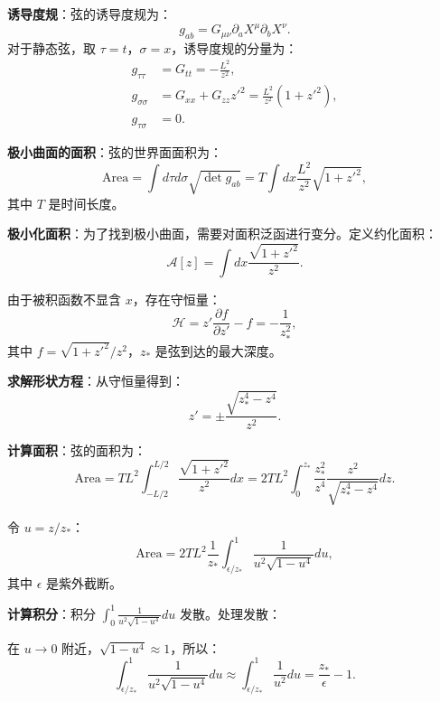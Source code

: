 \textbf{诱导度规}：弦的诱导度规为：
\begin{equation}
    g_{ab} = G_{\mu\nu} \partial_a X^\mu \partial_b X^\nu.
\end{equation}
对于静态弦，取 $\tau = t$，$\sigma = x$，诱导度规的分量为：
\begin{align}
    g_{\tau\tau} &= G_{tt} = -\frac{L^2}{z^2}, \\
    g_{\sigma\sigma} &= G_{xx} + G_{zz} z'^2 = \frac{L^2}{z^2}(1 + z'^2), \\
    g_{\tau\sigma} &= 0.
\end{align}

\textbf{极小曲面的面积}：弦的世界面面积为：
\begin{equation}
    \text{Area} = \int d\tau d\sigma \sqrt{\det g_{ab}} = T \int dx \frac{L^2}{z^2} \sqrt{1 + z'^2},
\end{equation}
其中 $T$ 是时间长度。

\textbf{极小化面积}：为了找到极小曲面，需要对面积泛函进行变分。定义约化面积：
\begin{equation}
    \mathcal{A}[z] = \int dx \frac{\sqrt{1 + z'^2}}{z^2}.
\end{equation}

由于被积函数不显含 $x$，存在守恒量：
\begin{equation}
    \mathcal{H} = z' \frac{\partial f}{\partial z'} - f = -\frac{1}{z_*^2},
\end{equation}
其中 $f = \sqrt{1 + z'^2}/z^2$，$z_*$ 是弦到达的最大深度。

\textbf{求解形状方程}：从守恒量得到：
\begin{equation}
    z' = \pm \frac{\sqrt{z_*^4 - z^4}}{z^2}.
\end{equation}

\textbf{计算面积}：弦的面积为：
\begin{equation}
    \text{Area} = T L^2 \int_{-L/2}^{L/2} \frac{\sqrt{1 + z'^2}}{z^2} dx = 2 T L^2 \int_0^{z_*} \frac{z_*^2}{z^4} \frac{z^2}{\sqrt{z_*^4 - z^4}} dz.
\end{equation}

令 $u = z/z_*$：
\begin{equation}
    \text{Area} = 2 T L^2 \frac{1}{z_*} \int_{\epsilon/z_*}^1 \frac{1}{u^2 \sqrt{1 - u^4}} du,
\end{equation}
其中 $\epsilon$ 是紫外截断。

\textbf{计算积分}：积分 $\int_0^1 \frac{1}{u^2 \sqrt{1 - u^4}} du$ 发散。处理发散：

在 $u \to 0$ 附近，$\sqrt{1 - u^4} \approx 1$，所以：
\begin{equation}
    \int_{\epsilon/z_*}^1 \frac{1}{u^2 \sqrt{1 - u^4}} du \approx \int_{\epsilon/z_*}^1 \frac{1}{u^2} du = \frac{z_*}{\epsilon} - 1.
\end{equation}

